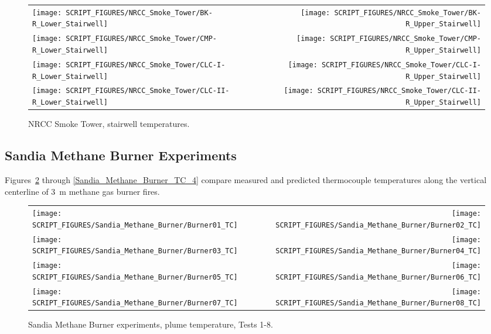 \begin{figure}[p]
\begin{tabular*}{\textwidth}{l@{\extracolsep{\fill}}r}
\texttt{[image: SCRIPT\_FIGURES/NRCC\_Smoke\_Tower/BK-R\_Lower\_Stairwell]} &
\texttt{[image: SCRIPT\_FIGURES/NRCC\_Smoke\_Tower/BK-R\_Upper\_Stairwell]} \\
\texttt{[image: SCRIPT\_FIGURES/NRCC\_Smoke\_Tower/CMP-R\_Lower\_Stairwell]} &
\texttt{[image: SCRIPT\_FIGURES/NRCC\_Smoke\_Tower/CMP-R\_Upper\_Stairwell]} \\
\texttt{[image: SCRIPT\_FIGURES/NRCC\_Smoke\_Tower/CLC-I-R\_Lower\_Stairwell]} &
\texttt{[image: SCRIPT\_FIGURES/NRCC\_Smoke\_Tower/CLC-I-R\_Upper\_Stairwell]} \\
\texttt{[image: SCRIPT\_FIGURES/NRCC\_Smoke\_Tower/CLC-II-R\_Lower\_Stairwell]} &
\texttt{[image: SCRIPT\_FIGURES/NRCC\_Smoke\_Tower/CLC-II-R\_Upper\_Stairwell]}
\end{tabular*}
\caption[NRCC Smoke Tower, stairwell temperatures]{NRCC Smoke Tower, stairwell temperatures.}
\label{NRCC_Smoke_Tower_Stairwell}
\end{figure}



\clearpage

\subsection{Sandia Methane Burner Experiments}

Figures~\ref{Sandia_Methane_Burner_TC_1} through \ref{Sandia_Methane_Burner_TC_4} compare measured and predicted thermocouple temperatures along the vertical centerline of 3~m methane gas burner fires.

\begin{figure}[p]
\begin{tabular*}{\textwidth}{l@{\extracolsep{\fill}}r}
\texttt{[image: SCRIPT\_FIGURES/Sandia\_Methane\_Burner/Burner01\_TC]} &
\texttt{[image: SCRIPT\_FIGURES/Sandia\_Methane\_Burner/Burner02\_TC]} \\
\texttt{[image: SCRIPT\_FIGURES/Sandia\_Methane\_Burner/Burner03\_TC]} &
\texttt{[image: SCRIPT\_FIGURES/Sandia\_Methane\_Burner/Burner04\_TC]} \\
\texttt{[image: SCRIPT\_FIGURES/Sandia\_Methane\_Burner/Burner05\_TC]} &
\texttt{[image: SCRIPT\_FIGURES/Sandia\_Methane\_Burner/Burner06\_TC]} \\
\texttt{[image: SCRIPT\_FIGURES/Sandia\_Methane\_Burner/Burner07\_TC]} &
\texttt{[image: SCRIPT\_FIGURES/Sandia\_Methane\_Burner/Burner08\_TC]} 
\end{tabular*}
\caption[Sandia Methane Burner, plume temperature, Tests 1-8]{Sandia Methane Burner experiments, plume temperature, Tests 1-8.}
\label{Sandia_Methane_Burner_TC_1}
\end{figure}


